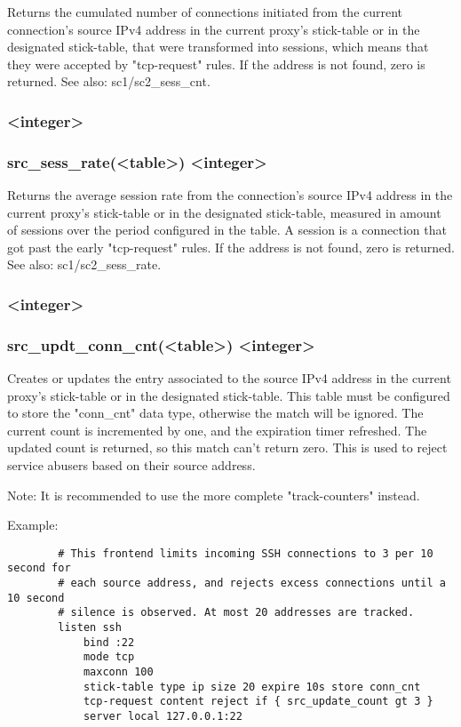 Returns the cumulated number of connections initiated from the current
connection's source IPv4 address in the current proxy's stick-table or in the
designated stick-table, that were transformed into sessions, which means that
they were accepted by "tcp-request" rules. If the address is not found, zero
is returned. See also: sc1/sc2\_sess\_cnt.

\subsubsection[src\_sess\_rate]{ <integer>}
\subsubsection*{src\_sess\_rate(<table>) <integer>}

Returns the average session rate from the connection's source IPv4 address in
the current proxy's stick-table or in the designated stick-table, measured in
amount of sessions over the period configured in the table. A session is a
connection that got past the early "tcp-request" rules. If the address is not
found, zero is returned. See also: sc1/sc2\_sess\_rate.

\subsubsection[src\_updt\_conn\_cnt]{ <integer>}
\subsubsection*{src\_updt\_conn\_cnt(<table>) <integer>}

Creates or updates the entry associated to the source IPv4 address in the
current proxy's stick-table or in the designated stick-table. This table
must be configured to store the "conn\_cnt" data type, otherwise the match
will be ignored. The current count is incremented by one, and the expiration
timer refreshed. The updated count is returned, so this match can't return
zero. This is used to reject service abusers based on their source address.

\begin{note}{Note:}
It is recommended to use the more complete "track-counters" instead.
\end{note}

  Example:
  \begin{verbatim}
        # This frontend limits incoming SSH connections to 3 per 10 second for
        # each source address, and rejects excess connections until a 10 second
        # silence is observed. At most 20 addresses are tracked.
        listen ssh
            bind :22
            mode tcp
            maxconn 100
            stick-table type ip size 20 expire 10s store conn_cnt
            tcp-request content reject if { src_update_count gt 3 }
            server local 127.0.0.1:22
  \end{verbatim}

